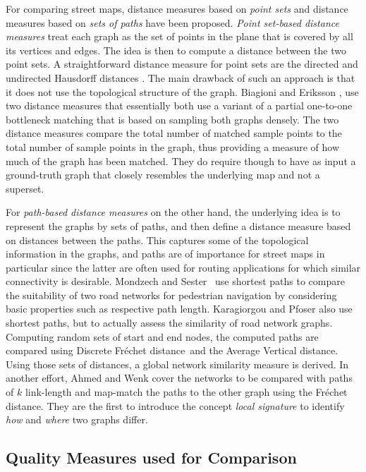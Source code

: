 \documentclass[natbib]{svjour3}                    \smartqed  \usepackage[table]{xcolor}
\newcommand{\Frd}{Fr\'echet distance}
\begin{document}
For comparing street maps, distance measures based on \emph{point sets} and distance measures based on \emph{sets of paths} have been proposed. 
\emph{Point set-based distance measures} treat each graph as the set of points in the plane that is covered by all its vertices and edges. The idea is then to compute a distance between the two point sets. A straightforward distance measure for point sets are the directed and undirected Hausdorff distances \cite{ag-dgsmi-99}. The main drawback of such an approach is that it does not use the topological structure of the graph. Biagioni and Eriksson \cite{be-irmgp-12,Liu:2012:MLS:2339530.2339637}, use two distance measures that essentially both use a variant of a partial one-to-one bottleneck matching that is based on sampling both graphs densely.
The two distance measures compare the total number of matched sample points to the total number of sample points in the graph, thus providing a measure of how much of the graph has been matched. They do require though to have as input a ground-truth graph that closely resembles the underlying map and not a superset.

For \emph{path-based distance measures} on the other hand, the underlying idea is to represent the graphs by sets of paths, and then define a distance measure based on distances between the paths. This captures some of the topological information in the graphs, and paths are of importance for street maps in particular since the latter are often used for routing applications for which similar connectivity is desirable. 
Mondzech and Sester~\cite{MondzechS11} use shortest paths to compare the suitability of two road networks for pedestrian navigation by considering basic properties such as respective path length. 
Karagiorgou and Pfoser \cite{Karagiorgou:2012:VTD:2424321.2424334} also use shortest paths, but to actually assess the similarity of road network graphs. Computing random sets of start and end nodes, the computed paths are compared using Discrete \Frd\ and the Average Vertical distance. Using those sets of distances, a global network similarity measure is derived.
In another effort, Ahmed and Wenk \cite{aw-SIGSPATIAL-13} cover the networks to be compared with paths of $k$ link-length and map-match the paths to the other graph using the \Frd. They are the first to introduce the concept {\em local signature} to identify {\em how} and {\em where} two graphs differ.  

\subsection{Quality Measures used for Comparison}
\label{subsec:subsec_qmu}
\end{document}
